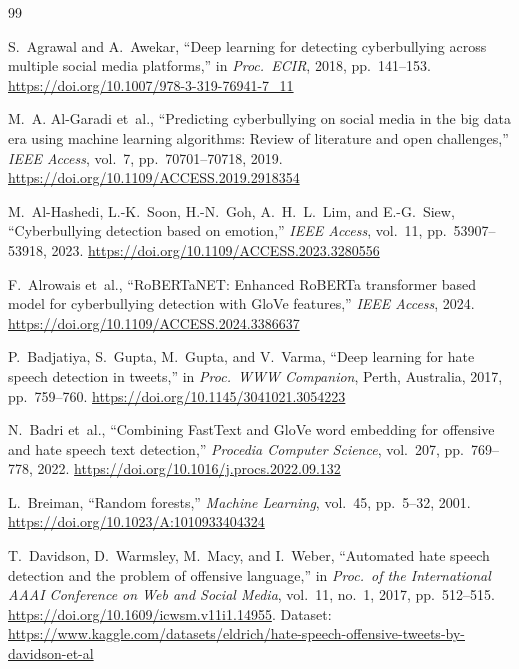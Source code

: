 \documentclass[10pt,twocolumn,a4paper]{article}
\begin{document}
\begin{thebibliography}{99}

S.~Agrawal and A.~Awekar, ``Deep learning for detecting cyberbullying across multiple social media platforms,'' in \textit{Proc.\ ECIR}, 2018, pp.~141--153. \url{https://doi.org/10.1007/978-3-319-76941-7_11}

M.~A. Al-Garadi et~al., ``Predicting cyberbullying on social media in the big data era using machine learning algorithms: Review of literature and open challenges,'' \textit{IEEE Access}, vol.~7, pp.~70701--70718, 2019. \url{https://doi.org/10.1109/ACCESS.2019.2918354}

M.~Al-Hashedi, L.-K.~Soon, H.-N.~Goh, A.~H.~L.~Lim, and E.-G.~Siew, ``Cyberbullying detection based on emotion,'' \textit{IEEE Access}, vol.~11, pp.~53907--53918, 2023. \url{https://doi.org/10.1109/ACCESS.2023.3280556}

F.~Alrowais et~al., ``RoBERTaNET: Enhanced RoBERTa transformer based model for cyberbullying detection with GloVe features,'' \textit{IEEE Access}, 2024. \url{https://doi.org/10.1109/ACCESS.2024.3386637}

P.~Badjatiya, S.~Gupta, M.~Gupta, and V.~Varma, ``Deep learning for hate speech detection in tweets,'' in \textit{Proc.\ WWW Companion}, Perth, Australia, 2017, pp.~759--760. \url{https://doi.org/10.1145/3041021.3054223}

N.~Badri et~al., ``Combining FastText and GloVe word embedding for offensive and hate speech text detection,'' \textit{Procedia Computer Science}, vol.~207, pp.~769--778, 2022. \url{https://doi.org/10.1016/j.procs.2022.09.132}

L.~Breiman, ``Random forests,'' \textit{Machine Learning}, vol.~45, pp.~5--32, 2001. \url{https://doi.org/10.1023/A:1010933404324}

T.~Davidson, D.~Warmsley, M.~Macy, and I.~Weber, ``Automated hate speech detection and the problem of offensive language,'' in \textit{Proc.\ of the International AAAI Conference on Web and Social Media}, vol.~11, no.~1, 2017, pp.~512--515. \url{https://doi.org/10.1609/icwsm.v11i1.14955}. Dataset: \url{https://www.kaggle.com/datasets/eldrich/hate-speech-offensive-tweets-by-davidson-et-al}


\end{thebibliography}
\end{document}
